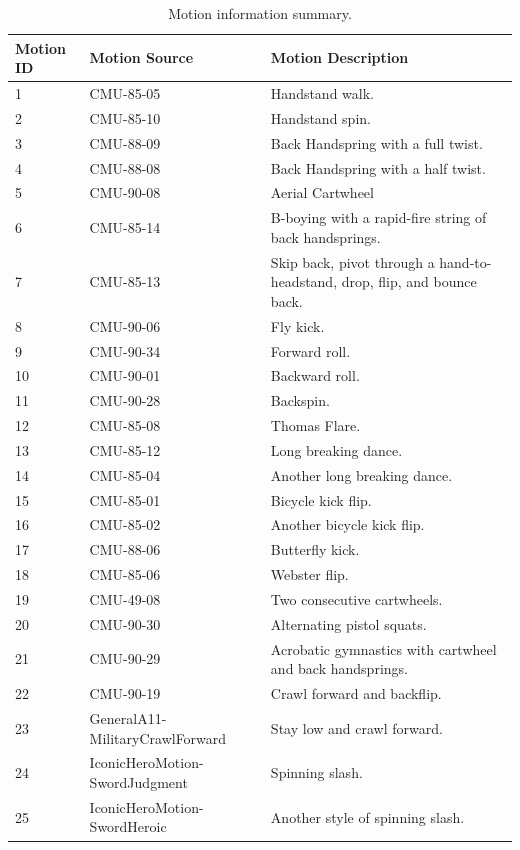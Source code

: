 \begin{table}[htbp]
  \centering
  \caption{Motion information summary.} %
  \label{tab:motion_info}
  \begin{tabularx}{\textwidth}{llX}
    \toprule
    Motion ID & Motion Source & Motion Description \\
    \midrule
    1 & CMU-85-05 & Handstand walk. \\
    2 & CMU-85-10 & Handstand spin. \\
    3 & CMU-88-09 & Back Handspring with a full twist. \\
    4 & CMU-88-08 & Back Handspring with a half twist. \\
    5 & CMU-90-08 & Aerial Cartwheel \\
    6 & CMU-85-14 & B-boying with a rapid-fire string of back handsprings. \\
    7 & CMU-85-13 & Skip back, pivot through a hand-to-headstand, drop, flip, and bounce back. \\
    8 & CMU-90-06 & Fly kick. \\
    9 & CMU-90-34 & Forward roll. \\
    10 & CMU-90-01 & Backward roll. \\
    11 & CMU-90-28 & Backspin. \\
    12 & CMU-85-08 & Thomas Flare. \\
    13 & CMU-85-12 & Long breaking dance. \\
    14 & CMU-85-04 & Another long breaking dance. \\
    15 & CMU-85-01 & Bicycle kick flip. \\
    16 & CMU-85-02 & Another bicycle kick flip. \\
    17 & CMU-88-06 & Butterfly kick. \\
    18 & CMU-85-06 & Webster flip. \\
    19 & CMU-49-08 & Two consecutive cartwheels. \\
    20 & CMU-90-30 & Alternating pistol squats. \\
    21 & CMU-90-29 & Acrobatic gymnastics with cartwheel and back handsprings. \\
    22 & CMU-90-19 & Crawl forward and backflip. \\
    23 & GeneralA11-MilitaryCrawlForward & Stay low and crawl forward. \\
    24 & IconicHeroMotion-SwordJudgment & Spinning slash. \\
    25 & IconicHeroMotion-SwordHeroic & Another style of spinning slash. \\

\end{tabularx}
\end{table}
